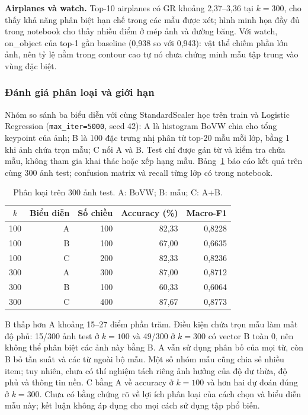 \textbf{Airplanes và watch.} Top-10 airplanes có GR khoảng 2,37--3,36 tại $k=300$, cho thấy khả năng
phân biệt hạn chế trong các mẫu được xét; hình minh họa đầy đủ trong notebook cho thấy nhiều điểm ở mép
ảnh và đường băng. Với watch, on\_object của top-1 gần baseline (0,938 so với 0,943): vật thể chiếm phần
lớn ảnh, nên tỷ lệ nằm trong contour cao tự nó chưa chứng minh mẫu tập trung vào vùng đặc biệt.

\subsubsection{Đánh giá phân loại và giới hạn}
Nhóm so sánh ba biểu diễn với cùng StandardScaler học trên train và Logistic Regression
(\texttt{max\_iter=5000}, seed 42): A là histogram BoVW chia cho tổng keypoint của ảnh; B là 100 đặc trưng
nhị phân từ top-20 mẫu mỗi lớp, bằng 1 khi ảnh chứa trọn mẫu; C nối A và B. Test chỉ được gán từ và kiểm tra
chứa mẫu, không tham gia khai thác hoặc xếp hạng mẫu. Bảng~\ref{tab:app2-classify} báo cáo kết quả trên cùng
300 ảnh test; confusion matrix và recall từng lớp có trong notebook.

\begin{table}[!t]
\centering
\caption{Phân loại trên 300 ảnh test. A: BoVW; B: mẫu; C: A+B.}
\label{tab:app2-classify}
\footnotesize
\begin{tabular}{crrrr}\hline
$k$ & Biểu diễn & Số chiều & Accuracy (\%) & Macro-F1\\\hline
100 & A & 100 & 82,33 & 0,8228\\
100 & B & 100 & 67,00 & 0,6635\\
100 & C & 200 & 82,33 & 0,8236\\\hline
300 & A & 300 & 87,00 & 0,8712\\
300 & B & 100 & 60,33 & 0,6064\\
300 & C & 400 & 87,67 & 0,8773\\\hline
\end{tabular}
\end{table}

B thấp hơn A khoảng 15--27 điểm phần trăm. Điều kiện chứa trọn mẫu làm mất độ phủ: 15/300 ảnh test ở
$k=100$ và 49/300 ở $k=300$ có vector B toàn 0, nên không thể phân biệt các ảnh này bằng B. A vẫn sử dụng
phân bố của mọi từ, còn B bỏ tần suất và các từ ngoài bộ mẫu. Một số nhóm mẫu cũng chia sẻ nhiều item;
tuy nhiên, chưa có thí nghiệm tách riêng ảnh hưởng của độ dư thừa, độ phủ và thông tin nền. C bằng A về
accuracy ở $k=100$ và hơn hai dự đoán đúng ở $k=300$. Chưa có bằng chứng rõ về lợi ích phân loại của
cách chọn và biểu diễn mẫu này; kết luận không áp dụng cho mọi cách sử dụng tập phổ biến.

